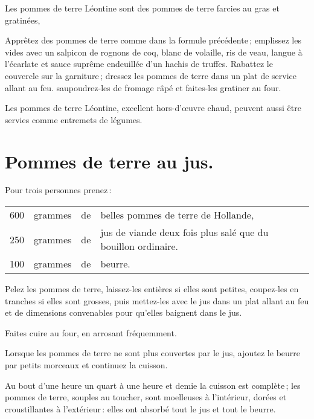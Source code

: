 Les pommes de terre Léontine sont des pommes de terre farcies au gras et
gratinées,

Apprêtez des pommes de terre comme dans la formule précédente ; emplissez les
vides avec un salpicon de rognons de coq, blanc de volaille, ris de veau,
langue à l'écarlate et sauce suprême endeuillée d'un hachis de truffes.
Rabattez le couvercle sur la garniture ; dressez les pommes de terre dans un
plat de service allant au feu. saupoudrez-les de fromage râpé et faites-les
gratiner au four.

\medskip

Les pommes de terre Léontine, excellent hors-d'œuvre chaud, peuvent aussi
être servies comme entremets de légumes.

\section*{\centering Pommes de terre au jus.}
{}

Pour trois personnes prenez :

\footnotesize
\begin{longtable}{rrrp{16em}}
    600 & grammes & de & belles pommes de terre de Hollande,                                              \\
    250 & grammes & de & jus de viande deux fois plus salé que du bouillon ordinaire.                     \\
    100 & grammes & de & beurre.                                                                          \\
\end{longtable}
\normalsize

Pelez les pommes de terre, laissez-les entières si elles sont petites, coupez-les
en tranches si elles sont grosses, puis mettez-les avec le jus dans un plat allant
au feu et de dimensions convenables pour qu'elles baignent dans le jus.

Faites cuire au four, en arrosant fréquemment.

Lorsque les pommes de terre ne sont plus couvertes par le jus, ajoutez le
beurre par petits morceaux et continuez la cuisson.

Au bout d'une heure un quart à une heure et demie la cuisson est complète ;
les pommes de terre, souples au toucher, sont moelleuses à l'intérieur, dorées et
croustillantes à l'extérieur : elles ont absorbé tout le jus et tout le beurre.

